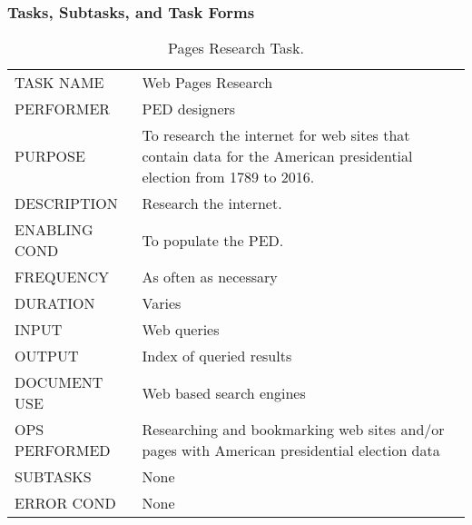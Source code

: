\documentclass{article}
\begin{document}
\subsubsection{Tasks, Subtasks, and Task Forms}

\begin{table}[h!]
  \centering
  \caption{Pages Research Task.}
  \label{tab:table5}
  \begin{tabular}{lp{10cm}}
       \hline
     TASK NAME & Web Pages Research\\
     PERFORMER & PED designers\\
     PURPOSE & To research the internet for web sites that contain data for the American presidential election from 1789 to 2016. \\
     DESCRIPTION & Research the internet.\\
     ENABLING COND & To populate the PED.\\
     FREQUENCY & As often as necessary\\
     DURATION & Varies\\
     INPUT & Web queries\\
     OUTPUT & Index of queried results\\
     DOCUMENT USE &Web based search engines \\
     OPS PERFORMED & Researching and bookmarking web sites and/or pages with American presidential election data \\
     SUBTASKS & None\\
     ERROR COND &  None\\
       \hline
  \end{tabular}
\end{table}
\end{document}
